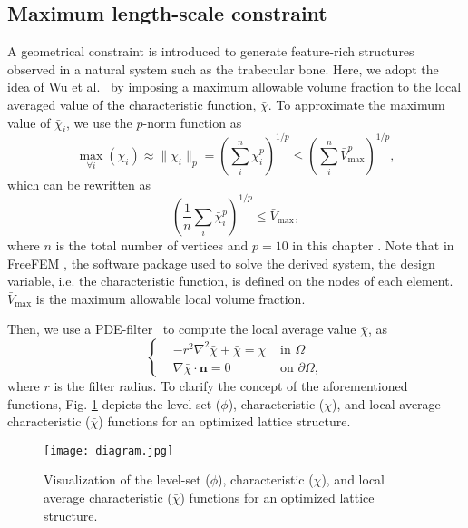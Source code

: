 \begin{subappendices}
\subsection{Maximum length-scale constraint}\label{Section: Maximum length-scale constraint}
A geometrical constraint is introduced to generate feature-rich structures observed in a natural system such as the trabecular bone. Here, we adopt the idea of Wu et al.\ \cite{wu2017infill} by imposing a maximum allowable volume fraction to the local averaged value of the characteristic function, $\bar{\chi}$. To approximate the maximum value of $\bar{\chi}_i$, we use the $p$-norm function as
\begin{equation} \label{eq:infill_vmax_1}
\max_{\forall i} \left(\bar{\chi}_i \right) \approx  
\|\bar{\chi}_i \|_{p}=\left(\sum_i^n \bar{\chi}_{i}^{p}\right)^{1/p}
\leq \left( \sum_{i}^n \bar{V}_{\max}^p \right)^{1/p}, 
\end{equation}
which can be rewritten as
\begin{equation} \label{eq:infill_vmax_2}
\left(\dfrac{1}{n} \sum_{i} \bar{\chi}_{i}^{p}\right)^{1 / p} \leq \bar{V}_{\max },
\end{equation}
where $n$ is the total number of vertices and $p=10$ in this chapter \cite{li2021full}. Note that in FreeFEM \cite{Hecht2012}, the software package used to solve the derived system, the design variable, i.e. the characteristic function, is defined on the nodes of each element. $ \bar{V}_{\max }$ is the maximum allowable local volume fraction. 

Then, we use a \gls{PDE}-filter\ \cite{lazarov2011filters,kawamoto2011heaviside} to compute the local average value $\bar{\chi}$, as
\begin{equation}
	\left\{\begin{aligned}	
		& -r^2 \nabla^2 \bar{\chi} +  \bar{\chi} =  \chi & \text{ in } \Omega \\
		& \nabla \bar{\chi} \cdot \boldsymbol{n} = 0 & \text{ on } \partial \Omega,
	\end{aligned}\right.
	\label{Eq: pde filter}
\end{equation}
where $r$ is the filter radius. To clarify the concept of the aforementioned functions, Fig. \ref{fig:infill_diagram} depicts the level-set ($\phi$), characteristic ($\chi$), and local average characteristic ($\bar{\chi}$) functions for an optimized lattice structure.

\begin{figure}[h]
\centering
\medskip
\texttt{[image: diagram.jpg]}
\caption[Visualization of function used for topology optimization]{Visualization of the level-set ($\phi$), characteristic ($\chi$), and local average characteristic ($\bar{\chi}$) functions for an optimized lattice structure.} \label{fig:infill_diagram}
\end{figure}


\end{subappendices}
